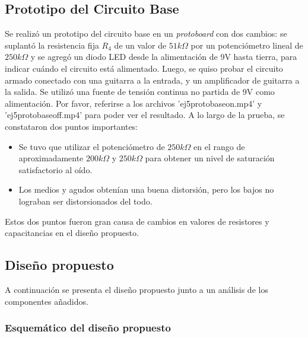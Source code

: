 \subsection{Prototipo del Circuito Base}
Se realizó un prototipo del circuito base en un \textit{protoboard} con dos cambios: se suplantó la resistencia fija $R_4$ de un valor de $51k\Omega$ por un potenciómetro lineal de $250k\Omega$ y se agregó un diodo LED desde la alimentación de 9V hasta tierra, para indicar cuándo el circuito está alimentado. Luego, se quiso probar el circuito armado conectado con una guitarra a la entrada, y un amplificador de guitarra a la salida. Se utilizó una fuente de tensión continua no partida de 9V como alimentación. Por favor, referirse a los archivos 'ej5protobaseon.mp4' y 'ej5protobaseoff.mp4' para poder ver el resultado.
A lo largo de la prueba, se constataron dos puntos importantes:
\begin{itemize}
\item Se tuvo que utilizar el potenciómetro de $250k\Omega$ en el rango de aproximadamente $200k\Omega$ y $250k\Omega$ para obtener un nivel de saturación satisfactorio al oído.
\item Los medios y agudos obtenían una buena distorsión, pero los bajos no lograban ser distorsionados del todo.
\end{itemize}
Estos dos puntos fueron gran causa de cambios en valores de resistores y capacitancias en el diseño propuesto.

\subsection{Diseño propuesto}

A continuación se presenta el diseño propuesto junto a un análisis de los componentes añadidos.

\subsubsection{Esquemático del diseño propuesto}

